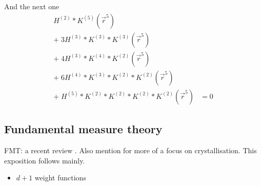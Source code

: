 And the next one%
\begin{equation}
  \begin{split}
    H^{(2)} * K^{(5)} (\vec{r}^5) & \\
    + \; 3 H^{(3)} * K^{(3)} * K^{(3)} (\vec{r}^5) & \\
    + \; 4 H^{(3)} * K^{(4)} * K^{(2)} (\vec{r}^5) & \\
    + \; 6 H^{(4)} * K^{(3)} * K^{(2)} * K^{(2)} (\vec{r}^5) & \\
    + \; H^{(5)} * K^{(2)} * K^{(2)} * K^{(2)} * K^{(2)} (\vec{r}^5)
    &=
    0
  \end{split}
\end{equation}

\subsection{Fundamental measure theory}

FMT: a recent review \cite{RothJPCM2010}.
Also mention \cite{LutskoAiCP2010} for more of a focus on crystallisation.
This exposition follows \cite{RothJPCM2010} mainly.


\begin{itemize}
\item $d+1$ weight functions
\end{itemize}


